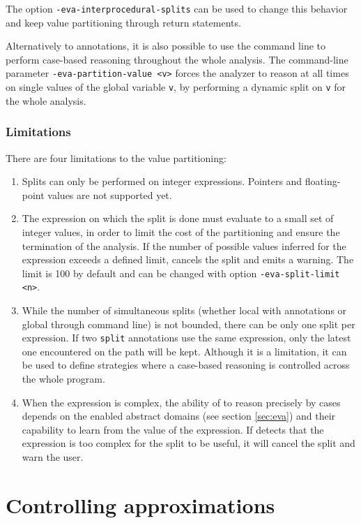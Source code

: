 \documentclass{frama-c-book}
\begin{document}
The option \lstinline|-eva-interprocedural-splits| can be used to change this
behavior and keep value partitioning through return statements.

Alternatively to annotations, it is also possible to use the command line to
perform case-based reasoning throughout the whole analysis. The command-line parameter
\lstinline|-eva-partition-value <v>| forces the analyzer to reason at all times
on single values of the global variable \lstinline|v|, by performing a
dynamic split on \lstinline|v| for the whole analysis.

\subsubsection{Limitations}

There are four limitations to the value partitioning:

\begin{enumerate}
\item Splits can only be performed on integer expressions. Pointers and
  floating-point values are not supported yet.
\item The expression on which the split is done must evaluate to a small set of
  integer values, in order to limit the cost of the partitioning and ensure the
  termination of the analysis. If the number of possible values inferred for the
  expression exceeds a defined limit, \Eva{} cancels the split and emits a
  warning. The limit is 100 by default and can be changed with option
  \lstinline|-eva-split-limit <n>|.
\item While the number of simultaneous splits (whether local with annotations
  or global through command line) is not bounded, there can be only one split
  per expression. If two \lstinline|split| annotations use the same expression,
  only the latest one encountered on the path will be kept. Although it is a
  limitation, it can be used to define strategies where a case-based reasoning
  is controlled across the whole program.
\item When the expression is complex, the ability of \Eva{} to reason
  precisely by cases depends on the enabled abstract domains (see section
  \ref{sec:eva}) and their capability to learn from the value of the expression.
  If \Eva{} detects that the expression is too complex for the split to be useful,
  it will cancel the split and warn the user.
\end{enumerate}


\section{Controlling approximations}
\label{controlling-approximations}
\end{document}
